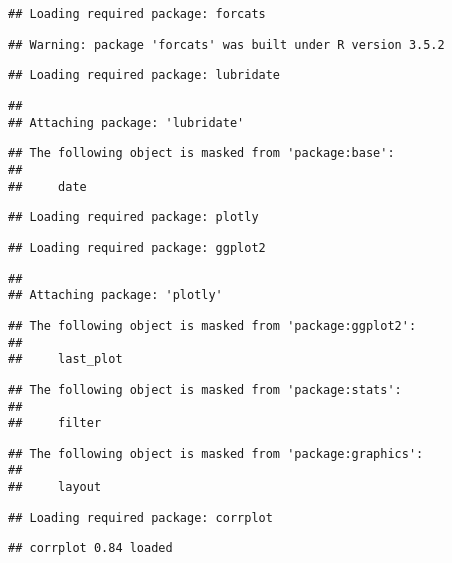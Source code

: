 \documentclass[]{article}
\begin{document}
\begin{verbatim}
## Loading required package: forcats
\end{verbatim}

\begin{verbatim}
## Warning: package 'forcats' was built under R version 3.5.2
\end{verbatim}

\begin{verbatim}
## Loading required package: lubridate
\end{verbatim}

\begin{verbatim}
## 
## Attaching package: 'lubridate'
\end{verbatim}

\begin{verbatim}
## The following object is masked from 'package:base':
## 
##     date
\end{verbatim}

\begin{verbatim}
## Loading required package: plotly
\end{verbatim}

\begin{verbatim}
## Loading required package: ggplot2
\end{verbatim}

\begin{verbatim}
## 
## Attaching package: 'plotly'
\end{verbatim}

\begin{verbatim}
## The following object is masked from 'package:ggplot2':
## 
##     last_plot
\end{verbatim}

\begin{verbatim}
## The following object is masked from 'package:stats':
## 
##     filter
\end{verbatim}

\begin{verbatim}
## The following object is masked from 'package:graphics':
## 
##     layout
\end{verbatim}

\begin{verbatim}
## Loading required package: corrplot
\end{verbatim}

\begin{verbatim}
## corrplot 0.84 loaded
\end{verbatim}
\end{document}
